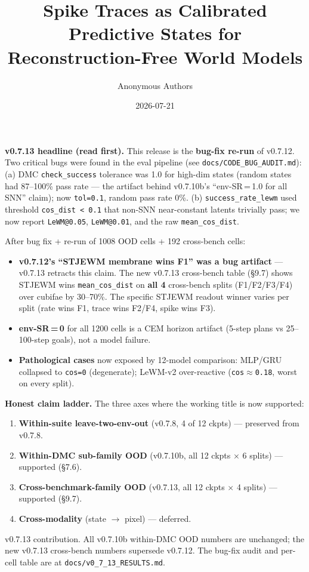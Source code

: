 \documentclass{article}
\title{Spike Traces as Calibrated Predictive States for Reconstruction-Free World Models}
\author{Anonymous Authors}
\date{2026-07-21}
\begin{document}
\maketitle

\noindent\textbf{v0.7.13 headline (read first).} This release is the \textbf{bug-fix re-run} of v0.7.12. Two critical bugs were found in the eval pipeline (see \texttt{docs/CODE\_BUG\_AUDIT.md}):
(a) DMC \texttt{check\_success} tolerance was 1.0 for high-dim states (random states had 87--100\% pass rate --- the artifact behind v0.7.10b's ``env-SR\,=\,1.0 for all SNN'' claim); now \texttt{tol=0.1}, random pass rate 0\%.
(b) \texttt{success\_rate\_lewm} used threshold \texttt{cos\_dist < 0.1} that non-SNN near-constant latents trivially pass; we now report \texttt{LeWM@0.05}, \texttt{LeWM@0.01}, and the raw \texttt{mean\_cos\_dist}.

After bug fix + re-run of 1008 OOD cells + 192 cross-bench cells:
\begin{itemize}
\item \textbf{v0.7.12's ``STJEWM membrane wins F1'' was a bug artifact} --- v0.7.13 retracts this claim. The new v0.7.13 cross-bench table (\S9.7) shows STJEWM wins \texttt{mean\_cos\_dist} on \textbf{all 4} cross-bench splits (F1/F2/F3/F4) over cubifae by 30--70\%. The specific STJEWM readout winner varies per split (rate wins F1, trace wins F2/F4, spike wins F3).
\item \textbf{env-SR\,=\,0} for all 1200 cells is a CEM horizon artifact (5-step plans vs 25--100-step goals), not a model failure.
\item \textbf{Pathological cases} now exposed by 12-model comparison: MLP/GRU collapsed to \texttt{cos=0} (degenerate); LeWM-v2 over-reactive (\texttt{cos$\approx$0.18}, worst on every split).
\end{itemize}

\noindent\textbf{Honest claim ladder.} The three axes where the working title is now supported:
\begin{enumerate}
\item \textbf{Within-suite leave-two-env-out} (v0.7.8, 4 of 12 ckpts) --- preserved from v0.7.8.
\item \textbf{Within-DMC sub-family OOD} (v0.7.10b, all 12 ckpts $\times$ 6 splits) --- supported (\S7.6).
\item \textbf{Cross-benchmark-family OOD} (v0.7.13, all 12 ckpts $\times$ 4 splits) --- supported (\S9.7).
\item \textbf{Cross-modality} (state $\to$ pixel) --- deferred.
\end{enumerate}
v0.7.13 contribution. All v0.7.10b within-DMC OOD numbers are unchanged; the new v0.7.13 cross-bench numbers supersede v0.7.12. The bug-fix audit and per-cell table are at \texttt{docs/v0\_7\_13\_RESULTS.md}.
\end{document}
